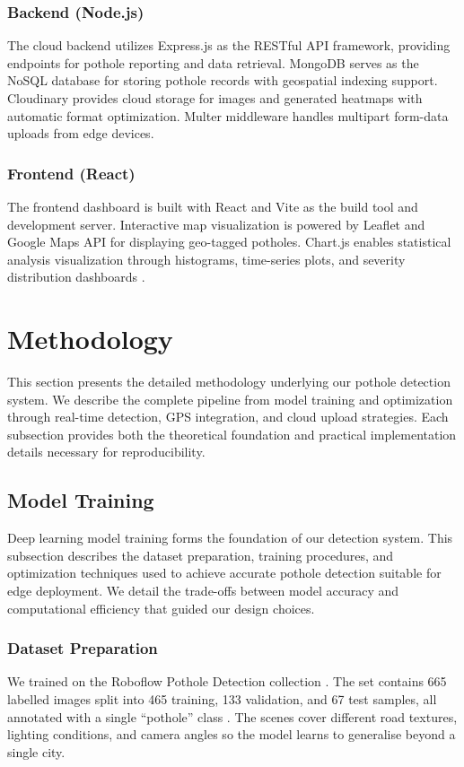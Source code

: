 \documentclass{ieeeaccess}
\begin{document}
\subsubsection{Backend (Node.js)}
The cloud backend utilizes Express.js as the RESTful API framework, providing endpoints for pothole reporting and data retrieval. MongoDB serves as the NoSQL database for storing pothole records with geospatial indexing support. Cloudinary provides cloud storage for images and generated heatmaps with automatic format optimization. Multer middleware handles multipart form-data uploads from edge devices.

\subsubsection{Frontend (React)}
The frontend dashboard is built with React and Vite as the build tool and development server. Interactive map visualization is powered by Leaflet and Google Maps API for displaying geo-tagged potholes. Chart.js enables statistical analysis visualization through histograms, time-series plots, and severity distribution dashboards \cite{b16}.

\section{Methodology}

This section presents the detailed methodology underlying our pothole detection system. We describe the complete pipeline from model training and optimization through real-time detection, GPS integration, and cloud upload strategies. Each subsection provides both the theoretical foundation and practical implementation details necessary for reproducibility.

\subsection{Model Training}

Deep learning model training forms the foundation of our detection system. This subsection describes the dataset preparation, training procedures, and optimization techniques used to achieve accurate pothole detection suitable for edge deployment. We detail the trade-offs between model accuracy and computational efficiency that guided our design choices.

\subsubsection{Dataset Preparation}
We trained on the Roboflow Pothole Detection collection \cite{b13}. The set contains 665 labelled images split into 465 training, 133 validation, and 67 test samples, all annotated with a single ``pothole'' class \cite{b1}. The scenes cover different road textures, lighting conditions, and camera angles so the model learns to generalise beyond a single city.
\end{document}
